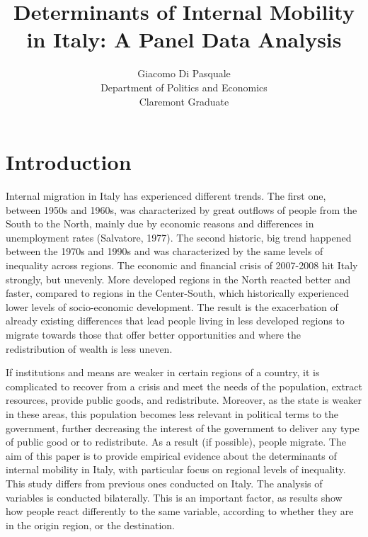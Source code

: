 \documentclass{article}
\title{Determinants of Internal Mobility in Italy: A Panel Data Analysis}
\author{Giacomo Di Pasquale\\
  \small Department of Politics and Economics\\
  \small Claremont Graduate 
}
\theoremstyle{definition}
\theoremstyle{remark}
\begin{document}
\maketitle


\section{Introduction}

Internal migration in Italy has experienced different trends. The first one, between 1950s and 1960s, was characterized by great outflows of people from the South to the North, mainly due by economic reasons and differences in unemployment rates (Salvatore, 1977). The second historic, big trend happened between the 1970s and 1990s and was characterized by the same levels of inequality across regions. The economic and financial crisis of 2007-2008 hit Italy strongly, but unevenly. More developed regions in the North reacted better and faster, compared to regions in the Center-South, which historically experienced lower levels of socio-economic development. The result is the exacerbation of already existing differences that lead people living in less developed regions to migrate towards those that offer better opportunities and where the redistribution of wealth is less uneven.

If institutions and means are weaker in certain regions of a country, it is complicated to recover from a crisis and meet the needs of the population, extract resources, provide public goods, and redistribute. Moreover, as the state is weaker in these areas, this population becomes less relevant in political terms to the government, further decreasing the interest of the government to deliver any type of public good or to redistribute. As a result (if possible), people migrate. The aim of this paper is to provide empirical evidence about the determinants of internal mobility in Italy, with particular focus on regional levels of inequality. 
This study differs from previous ones conducted on Italy. 
The analysis of variables is conducted bilaterally. This is an important factor, as results show how people react differently to the same variable, according to whether they are in the origin region, or the destination. 
\end{document}
